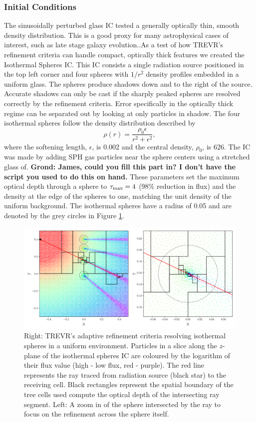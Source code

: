 \documentclass[fleq,usenatbib]{mnras}
\newcommand{\acro}{TREVR}
\newcommand{\comment}[1]{\textbf{\color{red}#1}}
\begin{document}
\subsubsection{Initial Conditions}
The sinusoidally perturbed glass IC tested a generally optically thin, smooth 
density distribution. This is a good proxy for many astrophysical cases of 
interest, such as late stage galaxy evolution..As a test of how \acro{}'s 
refinement criteria can handle compact, optically thick features we created 
the Isothermal Spheres IC. This IC consists a single radiation source 
positioned in the top left corner and four spheres with $1/r^2$ density 
profiles embedded in a uniform glass. The spheres produce shadows down and to 
the right of the source. Accurate shadows can only be cast if the sharply 
peaked spheres are resolved correctly by the refinement criteria. Error 
specifically in the optically thick regime can be separated out by looking at 
only particles in shadow. The four isothermal spheres follow the density 
distribution described by
\begin{equation}
\rho(r) = \frac{\rho_0 \epsilon}{r^2 + \epsilon^2},
\end{equation}
where the softening length, $\epsilon$, is 0.002 and the central density, 
$\rho_0$, is 626. The IC was made by adding SPH gas particles near the 
sphere centers using a stretched glass of. \comment{Grond: James, could you 
fill this part in? I don't have the script you used to do this on hand.} These 
parameters set the maximum optical depth through a sphere to 
$\tau_{\rm max}=4$ (98\% reduction in flux) and the density at the edge of the 
spheres to one, matching the unit density of the uniform background. The 
isothermal spheres have a radius of 0.05 and are denoted by the grey circles 
in Figure \ref{fig:cellplot}.  
\begin{figure}
\includegraphics[width=1\linewidth]{Figures/cellplot.pdf}
\caption{Right: \acro{}'s adaptive refinement criteria resolving isothermal 
spheres in a uniform environment. Particles in a slice along the $z$-plane of 
the isothermal spheres IC are coloured by the logarithm of their flux value 
(high - low flux, red - purple). The red line represents the ray traced from 
radiation source (black star) to the receiving cell. Black rectangles 
represent the spatial boundary of the tree cells used compute the optical 
depth of the intersecting ray segment. Left: A zoom in of the sphere 
intersected by the ray to focus on the refinement across the sphere itself.}
\label{fig:cellplot}
\end{figure}
\end{document}
